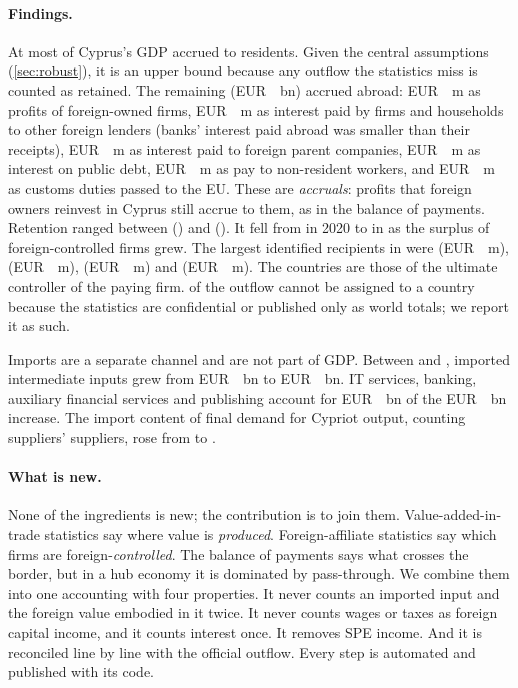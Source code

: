 \documentclass[11pt]{article}
\newcommand{\EUR}{EUR~}
\begin{document}
\paragraph{Findings.}
At most \DVRLast{} of Cyprus's \LastYear{} GDP accrued to residents.
Given the central assumptions (\cref{sec:robust}), it is an upper bound because any outflow the statistics miss is counted as retained.
The remaining \FVLLast{} (\EUR\FVLLastEUR~bn) accrued abroad: \EUR\MechFDI~m as profits of foreign-owned firms, \EUR\MechOther~m as interest paid by firms and households to other foreign lenders (banks' interest paid abroad was smaller than their receipts), \EUR\MechDebt~m as interest paid to foreign parent companies, \EUR\MechGov~m as interest on public debt, \EUR\MechLabour~m as pay to non-resident workers, and \EUR\MechEU~m as customs duties passed to the EU.
These are \emph{accruals}: profits that foreign owners reinvest in Cyprus still accrue to them, as in the balance of payments.
Retention ranged between \DVRMin{} (\DVRMinYear) and \DVRMax{} (\DVRMaxYear).
It fell from \DVRTwentyTwenty{} in 2020 to \DVRLast{} in \LastYear{} as the surplus of foreign-controlled firms grew.
The largest identified recipients in \LastYear{} were \RecOneName{} (\EUR\RecOneEUR~m), \RecTwoName{} (\EUR\RecTwoEUR~m), \RecThreeName{} (\EUR\RecThreeEUR~m) and \RecFourName{} (\EUR\RecFourEUR~m).
The countries are those of the ultimate controller of the paying firm.
\RecUnknownShare{} of the outflow cannot be assigned to a country because the statistics are confidential or published only as world totals; we report it as such.

Imports are a separate channel and are not part of GDP.
Between \FirstYear{} and \IOLastYear{}, imported intermediate inputs grew from \EUR\ImpInterFirst~bn to \EUR\ImpInterLast~bn.
IT services, banking, auxiliary financial services and publishing account for \EUR\ImpGrowthFour~bn of the \EUR\ImpGrowthTotal~bn increase.
The import content of final demand for Cypriot output, counting suppliers' suppliers, rose from \TICFirst{} to \TICLast{}.

\paragraph{What is new.}
None of the ingredients is new; the contribution is to join them.
Value-added-in-trade statistics say where value is \emph{produced}.
Foreign-affiliate statistics say which firms are foreign-\emph{controlled}.
The balance of payments says what crosses the border, but in a hub economy it is dominated by pass-through.
We combine them into one accounting with four properties.
It never counts an imported input and the foreign value embodied in it twice.
It never counts wages or taxes as foreign capital income, and it counts interest once.
It removes SPE income.
And it is reconciled line by line with the official outflow.
Every step is automated and published with its code.
\end{document}
